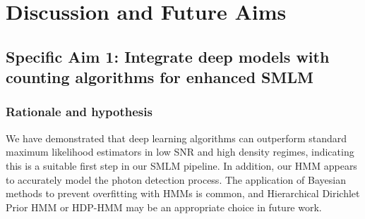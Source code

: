 \documentclass{ucetd}
\begin{document}

\section{Discussion and Future Aims}

\subsection{Specific Aim 1: Integrate deep models with counting algorithms for enhanced SMLM}

\subsubsection{Rationale and hypothesis}

We have demonstrated that deep learning algorithms can outperform standard maximum likelihood estimators in low SNR and high density regimes, indicating this is a suitable first step in our SMLM pipeline. In addition, our HMM appears to accurately model the photon detection process. The application of Bayesian methods to prevent overfitting with HMMs is common, and Hierarchical Dirichlet Prior HMM or HDP-HMM may be an appropriate choice in future work. 
\end{document}
